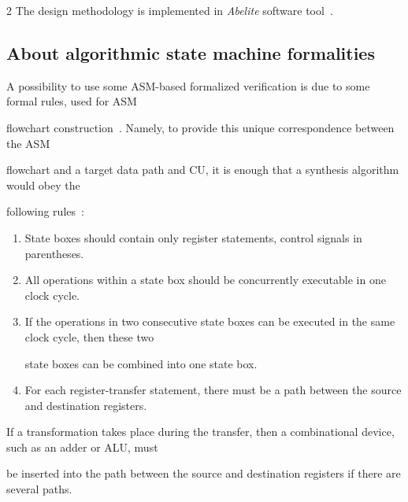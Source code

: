 \begin{multicols}{2}
   The design methodology is implemented in \textit{Abelite} software tool~\cite{26bar}.





       \subsection{About algorithmic state machine formalities} %





\noindent


A possibility to use some ASM-based formalized veri\-fi\-cation is due to some formal rules, used for ASM


flowchart construction~\cite{5bar, 26bar}.  Namely, to provide this unique correspondence between the ASM


flowchart and a target data path and CU, it is enough that a synthesis algorithm would obey the


following rules~\cite{5bar}:


\begin{enumerate}[1.]


\item  State boxes should contain only register statements, control signals in parentheses.


\item All operations within a state box should be con\-current\-ly executable in one clock cycle.


\item If the operations in two consecutive state boxes can be executed in the same clock cycle, then these two


state boxes can be combined into one state box.


\item  For each register-transfer statement, there must be a path between the source and destination registers.


\end{enumerate}





If a transformation takes place during the transfer, then a combinational device, such as an adder or ALU, must


be inserted into the path between the source and destination registers if there are several paths.






\end{multicols}
